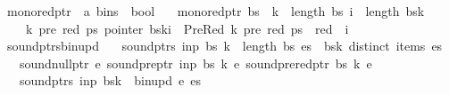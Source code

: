 \begin{isabellebody}
\isanewline
{}\isamarkupfalse%
\ mono{\isacharunderscore}{\kern0pt}red{\isacharunderscore}{\kern0pt}ptr\ {\isacharcolon}{\kern0pt}{\isacharcolon}{\kern0pt}\ {\isachardoublequoteopen}{\isacharprime}{\kern0pt}a\ bins\ {\isasymRightarrow}\ bool{\isachardoublequoteclose}\ \isanewline
\ \ {\isachardoublequoteopen}mono{\isacharunderscore}{\kern0pt}red{\isacharunderscore}{\kern0pt}ptr\ bs\ {\isacharequal}{\kern0pt}\ {\isacharparenleft}{\kern0pt}{\isasymforall}k\ {\isacharless}{\kern0pt}\ length\ bs{\isachardot}{\kern0pt}\ {\isasymforall}i\ {\isacharless}{\kern0pt}\ length\ {\isacharparenleft}{\kern0pt}bs{\isacharbang}{\kern0pt}k{\isacharparenright}{\kern0pt}{\isachardot}{\kern0pt}\isanewline
\ \ \ \ {\isasymforall}k{\isacharprime}{\kern0pt}\ pre\ red\ ps{\isachardot}{\kern0pt}\ pointer\ {\isacharparenleft}{\kern0pt}bs{\isacharbang}{\kern0pt}k{\isacharbang}{\kern0pt}i{\isacharparenright}{\kern0pt}\ {\isacharequal}{\kern0pt}\ PreRed\ {\isacharparenleft}{\kern0pt}k{\isacharprime}{\kern0pt}{\isacharcomma}{\kern0pt}\ pre{\isacharcomma}{\kern0pt}\ red{\isacharparenright}{\kern0pt}\ ps\ {\isasymlongrightarrow}\ red\ {\isacharless}{\kern0pt}\ i{\isacharparenright}{\kern0pt}{\isachardoublequoteclose}\isanewline
\isanewline
{}\isamarkupfalse%
\ sound{\isacharunderscore}{\kern0pt}ptrs{\isacharunderscore}{\kern0pt}bin{\isacharunderscore}{\kern0pt}upd{\isacharcolon}{\kern0pt}\isanewline
\ \ \ {\isachardoublequoteopen}sound{\isacharunderscore}{\kern0pt}ptrs\ inp\ bs{\isachardoublequoteclose}\ {\isachardoublequoteopen}k\ {\isacharless}{\kern0pt}\ length\ bs{\isachardoublequoteclose}\ {\isachardoublequoteopen}es\ {\isacharequal}{\kern0pt}\ bs{\isacharbang}{\kern0pt}k{\isachardoublequoteclose}\ {\isachardoublequoteopen}distinct\ {\isacharparenleft}{\kern0pt}items\ es{\isacharparenright}{\kern0pt}{\isachardoublequoteclose}\isanewline
\ \ \ {\isachardoublequoteopen}sound{\isacharunderscore}{\kern0pt}null{\isacharunderscore}{\kern0pt}ptr\ e{\isachardoublequoteclose}\ {\isachardoublequoteopen}sound{\isacharunderscore}{\kern0pt}pre{\isacharunderscore}{\kern0pt}ptr\ inp\ bs\ k\ e{\isachardoublequoteclose}\ {\isachardoublequoteopen}sound{\isacharunderscore}{\kern0pt}prered{\isacharunderscore}{\kern0pt}ptr\ bs\ k\ e{\isachardoublequoteclose}\isanewline
\ \ \ {\isachardoublequoteopen}sound{\isacharunderscore}{\kern0pt}ptrs\ inp\ {\isacharparenleft}{\kern0pt}bs{\isacharbrackleft}{\kern0pt}k\ {\isacharcolon}{\kern0pt}{\isacharequal}{\kern0pt}\ bin{\isacharunderscore}{\kern0pt}upd\ e\ es{\isacharbrackright}{\kern0pt}{\isacharparenright}{\kern0pt}{\isachardoublequoteclose}%

\end{isabellebody}
